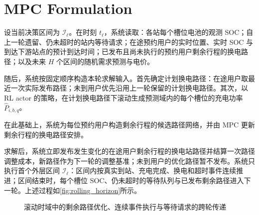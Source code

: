 \documentclass[12pt,a4paper,UTF8]{ctexart}
\begin{document}
\section{MPC Formulation}

设当前决策区间为 $\mathcal I_\ell$。在时刻 $t_\ell$，系统读取：各站每个槽位电池的观测 SOC；自上一轮遗留、仍未超时的站内等待请求；在途预约用户的实时位置、实时 SOC 与到达下游站点的预计到达时间；已发布且尚未执行的预约用户剩余行程的换电路径；以及未来 $H$ 个区间的随机需求预测与电价。

随后，系统按固定顺序构造本轮求解输入。首先确定计划换电路径：在途用户取最近一次实际发布路径；未到用户优先沿用上一轮保留的计划换电路径。其次，以RL actor 的策略，在计划换电路径下滚动生成预测域内的每个槽位的充电功率 $\widehat P_{i,b,q}$。

在此基础上，系统为每位预约用户构造剩余行程的候选路径网络，并由 MPC 更新剩余行程的换电路径安排。

求解后，系统立即发布发生变化的在途用户剩余行程的换电站路径并结算一次路径调整成本，新路径作为下一轮的调整基准；未到用户的优化路径暂不发布。系统只执行首个外层区间 $\mathcal I_\ell$：区间内按真实到站、充电完成、换电和超时事件连续推进；区间结束时，每个槽位 SOC、仍未超时的等待队列与已发布剩余路径进入下一轮。上述过程如\autoref{fig:rolling_horizon}所示。

\begin{figure}[!htbp]
  \centering
  \caption{滚动时域中的剩余路径优化、连续事件执行与等待请求的跨轮传递}
  \label{fig:rolling_horizon}
\end{figure}
\end{document}
